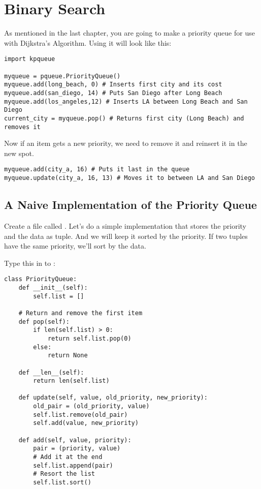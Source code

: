 \chapter{Binary Search}

As mentioned in the last chapter, you are going to make a priority
queue for use with Dijkstra's Algorithm.  Using it will look like this:

\begin{verbatim}
import kpqueue

myqueue = pqueue.PriorityQueue()
myqueue.add(long_beach, 0) # Inserts first city and its cost
myqueue.add(san_diego, 14) # Puts San Diego after Long Beach
myqueue.add(los_angeles,12) # Inserts LA between Long Beach and San Diego
current_city = myqueue.pop() # Returns first city (Long Beach) and removes it
\end{verbatim}

Now if an item gets a new priority, we need to remove it and reinsert it in the new spot.
\begin{verbatim}
myqueue.add(city_a, 16) # Puts it last in the queue
myqueue.update(city_a, 16, 13) # Moves it to between LA and San Diego
\end{verbatim}

\section{A Naive Implementation of the Priority Queue}

Create a file called . Let's do a simple
implementation that stores the priority and the data as tuple. And we
will keep it sorted by the priority.  If two tuples have the same
priority, we'll sort by the data.

Type this in to :
\begin{verbatim}
class PriorityQueue:
    def __init__(self):
        self.list = []
    
    # Return and remove the first item
    def pop(self):
        if len(self.list) > 0:
            return self.list.pop(0)
        else:
            return None
        
    def __len__(self):
        return len(self.list)

    def update(self, value, old_priority, new_priority):
        old_pair = (old_priority, value)
        self.list.remove(old_pair)
        self.add(value, new_priority)
    
    def add(self, value, priority):
        pair = (priority, value)
        # Add it at the end
        self.list.append(pair)
        # Resort the list
        self.list.sort()
\end{verbatim}

